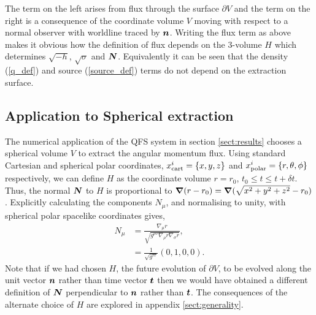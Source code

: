 The term on the left arises from flux through the surface $\partial V$ and the term on the right is a consequence of the coordinate volume $V$ moving with respect to a normal observer with worldline traced by $\boldsymbol{n}$. Writing the flux term as above makes it obvious how the definition of flux depends on the 3-volume $H$ which determines $\sqrt{-h}$, $\sqrt{\sigma}$ and $\boldsymbol{N}$. Equivalently it can be seen that the density (\ref{q_def}) and source (\ref{source_def}) terms do not depend on the extraction surface.










\subsection{Application to Spherical extraction} \label{sect:sphere}
The numerical application of the QFS system in section \ref{sect:results} chooses a spherical volume $V$ to extract the angular momentum flux. Using standard Cartesian and spherical polar coordinates, $x^i_{\rm{cart}} = \{x,y,z\}$ and $x^i_{\rm{polar}}=\{r,\theta,\phi\}$ respectively, we can define $H$ as the coordinate volume $r=r_0$, $t_0\leq t \leq t+\delta t$. Thus, the normal $\boldsymbol{N}$ to $H$ is proportional to $\boldsymbol{\nabla}(r-r_0) = \boldsymbol{\nabla}(\sqrt{x^2 + y^2 + z^2}-r_0)$. Explicitly calculating the components $N_\mu$, and normalising to unity, with spherical polar spacelike coordinates gives,
\begin{align}
N_\mu &= \frac{\nabla_\mu r}{\sqrt{g^{\rho\sigma} \nabla_\rho r \nabla_\sigma r}}, \\
     \label{radial_N} &= \frac{1}{\sqrt{g^{rr}}}(0,1,0,0).
\end{align}
Note that if we had chosen $H$, the future evolution of $\partial V$, to be evolved along the unit vector $\boldsymbol{n}$ rather than time vector $\boldsymbol{t}$ then we would have obtained a different definition of $\boldsymbol{N}$ perpendicular to $\boldsymbol{n}$ rather than $\boldsymbol{t}$. The consequences of the alternate choice of $H$ are explored in appendix \ref{sect:generality}.

